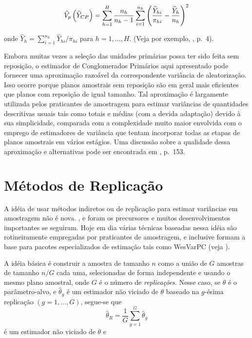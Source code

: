 \documentclass[]{book}
\numberwithin{example}{chapter}
\numberwithin{remark}{chapter}
\numberwithin{definition}{chapter}
\begin{document}
\begin{equation}
\widehat{V}_{p}\left( \widehat{Y}_{CP}\right) =\sum_{h=1}^{H}\frac{n_{h}}{%
n_{h}-1}\sum_{i=1}^{n_{h}}\left( \frac{\widehat{Y}_{hi}}{\pi _{hi}}-\frac{%
\widehat{Y}_{h}}{n_{h}}\right) ^{2}  \label{eq:estpa23}
\end{equation}

onde \(\widehat{Y}_{h}=\sum_{i=1}^{n_{h}}\widehat{Y}_{hi}/\pi _{hi}\)
para \(h=1,\ldots ,H\). (Veja por exemplo, \citep{Sudaan93}, p.~4).

Embora muitas vezes a seleção das unidades primárias possa ter sido
feita sem reposição, o estimador de Conglomerados Primários aqui
apresentado pode fornecer uma aproximação razoável da correspondente
variância de aleatorização. Isso ocorre porque planos amostrais sem
reposição são em geral mais eficientes que planos com reposição de igual
tamanho. Tal aproximação é largamente utilizada pelos praticantes de
amostragem para estimar variâncias de quantidades descritivas usuais
tais como totais e médias (com a devida adaptação) devido à sua
simplicidade, comparada com a complexidade muito maior envolvida com o
emprego de estimadores de variância que tentam incorporar todas as
etapas de planos amostrais em vários estágios. Uma discussão sobre a
qualidade dessa aproximação e alternativas pode ser encontrada em
\citep{SSW92}, p.~153.

\section{Métodos de Replicação}\label{metodos-de-replicacao}

A idéia de usar métodos indiretos ou de replicação para estimar
variâncias em amostragem não é nova. \citep{Mahala39}, \citep{Mahala44}
e \citep{deming} foram os precursores e muitos desenvolvimentos
importantes se seguiram. Hoje em dia várias técnicas baseadas nessa
idéia são rotineiramente empregadas por praticantes de amostragem, e
inclusive formam a base para pacotes especializados de estimação tais
como WesVarPC (veja \citep{Westat}).

A idéia básica é construir a amostra de tamanho \(n\) como a união de
\(G\) amostras de tamanho \(n/G\) cada uma, selecionadas de forma
independente e usando o mesmo plano amostral, onde \(G\) é o número de
\emph{replicações}. Nesse caso, se \(\theta\) é o parâmetro-alvo, e
\(\widehat{\theta}_{g}\) é um estimador não viciado de \(\theta\)
baseado na \(g\)-ésima replicação \((g=1,\ldots ,G)\), segue-se que \[
\widehat{\theta }_{R}=\frac{1}{G}\sum_{g=1}^{G}\widehat{\theta }_{g} 
\] é um estimador não viciado de \(\theta\) e
\end{document}
